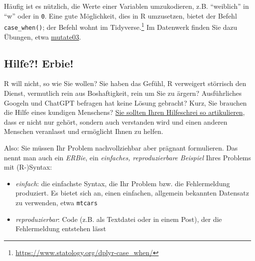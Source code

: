 \documentclass[
  letterpaper,
]{scrbook}
\providecommand{\tightlist}{%
  \setlength{\itemsep}{0pt}\setlength{\parskip}{0pt}}\usepackage{longtable,booktabs,array}
\theoremstyle{definition}
\theoremstyle{definition}
\theoremstyle{definition}
\theoremstyle{remark}
\begin{document}
Häufig ist es nützlich, die Werte einer Variablen umzukodieren, z.B.
\enquote{weiblich} in \enquote{w} oder in \texttt{0}. Eine gute
Möglichkeit, dies in R umzusetzen, bietet der Befehl
\texttt{case\_when()}; der Befehl wohnt im Tidyverse.\footnote{\url{https://www.statology.org/dplyr-case_when/}}
Im Datenwerk finden Sie dazu Übungen, etwa
\href{https://sebastiansauer.github.io/Datenwerk/posts/mutate03/mutate03.html}{mutate03}.

\subsection{Hilfe?! Erbie!}\label{sec-erbie}

R will nicht, so wie Sie wollen? Sie haben das Gefühl, R verweigert
störrisch den Dienst, vermutlich rein aus Boshaftigkeit, rein um Sie zu
ärgern? Ausführliches Googeln und ChatGPT befragen hat keine Lösung
gebracht? Kurz, Sie brauchen die Hilfe eines kundigen Menschens?
\href{https://data-se.netlify.app/2022/01/31/erbie-einfache-reproduzierbare-beispiele-ihres-problems-mit-r-syntax/}{Sie
sollten Ihren Hilfeschrei so artikulieren}, dass er nicht nur gehört,
sondern auch verstanden wird und einen anderen Menschen veranlasst und
ermöglicht Ihnen zu helfen.

Also: Sie müssen Ihr Problem nachvollziehbar aber prägnant formulieren.
Das nennt man auch ein \emph{ERBie}, ein \emph{einfaches,
reproduzierbare Beispiel} Ihres Problems mit (R-)Syntax:

\begin{itemize}
\tightlist
\item
  \emph{einfach}: die einfachste Syntax, die Ihr Problem bzw. die
  Fehlermeldung produziert. Es bietet sich an, einen einfachen,
  allgemein bekannten Datensatz zu verwenden, etwa \texttt{mtcars}
\item
  \emph{reproduzierbar}: Code (z.B. als Textdatei oder in einem Post),
  der die Fehlermeldung entstehen lässt
\end{itemize}
\end{document}
